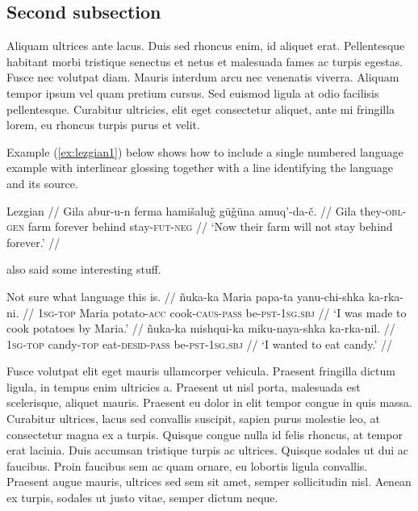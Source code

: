 \documentclass[12pt,letterpaper]{article}
\begin{document}
\subsection{Second subsection}

Aliquam ultrices ante lacus. Duis sed rhoncus enim, id aliquet erat. Pellentesque habitant morbi tristique senectus et netus et malesuada fames ac turpis egestas. Fusce nec volutpat diam. Mauris interdum arcu nec venenatis viverra. Aliquam tempor ipsum vel quam pretium cursus. Sed euismod ligula at odio facilisis pellentesque. Curabitur ultricies, elit eget consectetur aliquet, ante mi fringilla lorem, eu rhoncus turpis purus et velit.

Example (\ref{ex:lezgian1}) below shows how to include a single numbered language example with interlinear glossing together with a line identifying the language and its source.

\ex\label{ex:lezgian1}
	\begingl
		\glpreamble Lezgian \parencite[207]{haspelmath1993} //
		\gla Gila abur-u-n ferma hamišaluǧ güǧüna amuq’-da-č. //
		\glb Gila they-\textsc{obl}-\textsc{gen} farm forever behind stay-\textsc{fut}-\textsc{neg} //
		\glft ‘Now their farm will not stay behind forever.’ //
	\endgl
\xe

\textcite{silk2012} also said some interesting stuff.

\pex\label{ex:passives}
	\glpreamble Not sure what language this is. //
	\a\begingl
		\gla ñuka-ka Maria papa-ta yanu-chi-shka ka-rka-ni. //
		\glb \textsc{1sg}-\textsc{top} Maria potato-\textsc{acc} cook-\textsc{caus}-\textsc{pass} be-\textsc{pst}-\textsc{1sg.sbj} //
		\glft ‘I was made to cook potatoes by Maria.’ //
	\endgl
	\a\begingl
		\gla ñuka-ka mishqui-ka miku-naya-shka ka-rka-nil. //
		\glb \textsc{1sg}-\textsc{top} candy-\textsc{top} eat-\textsc{desid}-\textsc{pass} be-\textsc{pst}-\textsc{1sg.sbj} //
		\glft ‘I wanted to eat candy.’ //
	\endgl
\xe

Fusce volutpat elit eget mauris ullamcorper vehicula. Praesent fringilla dictum ligula, in tempus enim ultricies a. Praesent ut nisl porta, malesuada est scelerisque, aliquet mauris. Praesent eu dolor in elit tempor congue in quis massa. Curabitur ultrices, lacus sed convallis suscipit, sapien purus molestie leo, at consectetur magna ex a turpis. Quisque congue nulla id felis rhoncus, at tempor erat lacinia. Duis accumsan tristique turpis ac ultrices. Quisque sodales ut dui ac faucibus. Proin faucibus sem ac quam ornare, eu lobortis ligula convallis. Praesent augue mauris, ultrices sed sem sit amet, semper sollicitudin nisl. Aenean ex turpis, sodales ut justo vitae, semper dictum neque.


\printbibliography[heading=tuplusbib]
\end{document}
